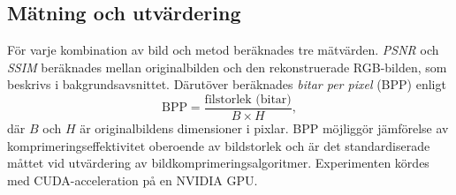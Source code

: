 \subsection*{Mätning och utvärdering}
För varje kombination av bild och metod beräknades tre mätvärden.
\textit{PSNR} och \textit{SSIM} beräknades mellan originalbilden och
den rekonstruerade RGB-bilden, som beskrivs i bakgrundsavsnittet.
Därutöver beräknades \textit{bitar per pixel} (BPP) enligt
\begin{equation}
  \text{BPP} = \frac{\text{filstorlek (bitar)}}{B \times H},
  \label{eq:bpp}
\end{equation}
där $B$ och $H$ är originalbildens dimensioner i pixlar.
BPP möjliggör jämförelse av komprimeringseffektivitet oberoende av bildstorlek
och är det standardiserade måttet vid utvärdering av bildkomprimeringsalgoritmer.
Experimenten kördes med CUDA-acceleration på en NVIDIA GPU.
